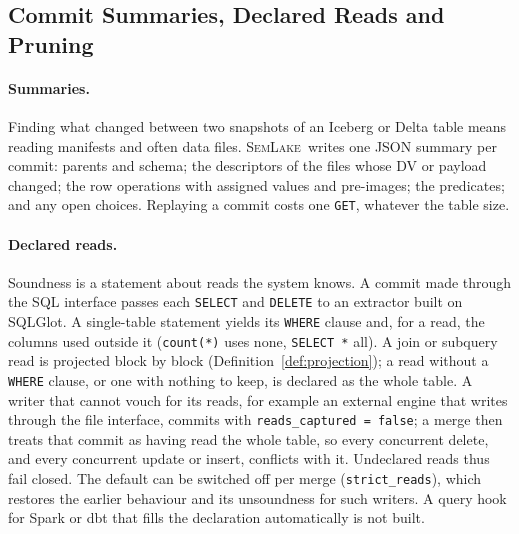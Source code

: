 \documentclass[sigconf, nonacm]{acmart}
\newcommand{\systemname}{\textsc{SemLake}}
\begin{document}
\subsection{Commit Summaries, Declared Reads and Pruning}
\label{sec:design_summaries}

\paragraph{Summaries.} Finding what changed between two snapshots of an Iceberg or Delta table means reading manifests and often data files. \systemname\ writes one JSON summary per commit: parents and schema; the descriptors of the files whose DV or payload changed; the row operations with assigned values and pre-images; the predicates; and any open choices. Replaying a commit costs one \texttt{GET}, whatever the table size.

\paragraph{Declared reads.} Soundness is a statement about reads the system knows. A commit made through the SQL interface passes each \texttt{SELECT} and \texttt{DELETE} to an extractor built on SQLGlot. A single-table statement yields its \texttt{WHERE} clause and, for a read, the columns used outside it (\texttt{count(*)} uses none, \texttt{SELECT *} all). A join or subquery read is projected block by block (Definition~\ref{def:projection}); a read without a \texttt{WHERE} clause, or one with nothing to keep, is declared as the whole table. A writer that cannot vouch for its reads, for example an external engine that writes through the file interface, commits with \texttt{reads\_captured = false}; a merge then treats that commit as having read the whole table, so every concurrent delete, and every concurrent update or insert, conflicts with it. Undeclared reads thus fail closed. The default can be switched off per merge (\texttt{strict\_reads}), which restores the earlier behaviour and its unsoundness for such writers. A query hook for Spark or dbt that fills the declaration automatically is not built.
\end{document}
